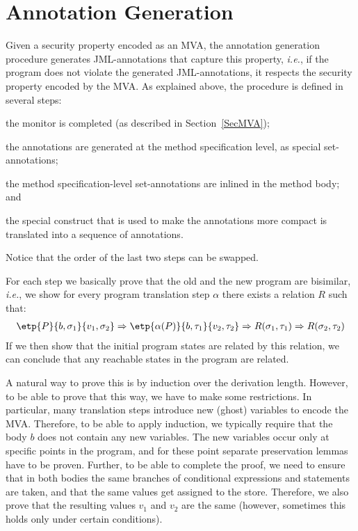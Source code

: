 \section{Annotation Generation}\label{SecAnnotGen}

Given a security property encoded as an MVA, the annotation generation
procedure generates JML-annotations that capture this property,
\emph{i.e.}, if the program does not violate the generated
JML-annotations, it respects the security property encoded by the
MVA. As explained above, the procedure is defined in several steps:
\begin{inparaenum}
\item the monitor is completed (as described in Section~\ref{SecMVA});
\item the annotations are generated at the method specification level,
as special set-annotations;
\item the method specification-level set-annotations are inlined in
the method body; and
\item the special \CaseJML construct that is used to make the
annotations more compact is translated into a sequence of \Set
annotations.
\end{inparaenum}
Notice that the order of the last two steps can be swapped.

For each step we basically prove that the old and the new program are
bisimilar, \emph{i.e.}, we show for every program translation step
\(\alpha\) there exists a relation \(R\) such that:
\[
\begin{array}{l}
\etp{P}{b,\sigma_1}{v_1, \sigma_2} \Rightarrow
\etp{\alpha(P)}{b, \tau_1}{v_2, \tau_2} \Rightarrow
R(\sigma_1, \tau_1) \Rightarrow
R(\sigma_2, \tau_2)
\end{array}
\]
If we then show that the initial program states are related by this
relation, we can conclude that any reachable states in the program are
related.

A natural way to prove this is by induction over the derivation
length. However, to be able to prove that this way, we have to make
some restrictions. In particular, many translation steps introduce new
(ghost) variables to encode the MVA. Therefore, to be able to apply
induction, we typically require that the body \(b\) does not contain
any new variables. The new variables occur only at specific points in
the program, and for these point separate preservation lemmas have to
be proven. Further, to be able to complete the proof, we need to
ensure that in both bodies the same branches of conditional
expressions and statements are taken, and that the same values get
assigned to the store. Therefore, we also prove that the resulting
values \(v_1\) and \(v_2\) are the same (however, sometimes this holds
only under certain conditions).




